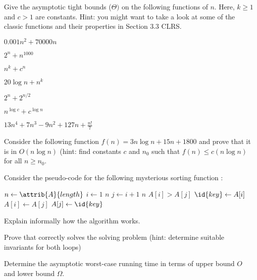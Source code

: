 \documentclass{article}
\begin{document}
\thispagestyle{fancy}

\begin{Exercise}

    \noindent
    Give the asymptotic tight bounds ($\Theta)$ on the following functions of
    $n$. Here, $k \geq 1$ and $c > 1$ are constants. Hint: you might want to
    take a look at some of the classic functions and their properties in Section
    3.3 CLRS.

    \Question
    $0.001n^2 + 70000n$
    
    \Question
    $2^n + n^{1000}$

    \Question
    $n^k + c^n$

    \Question
    $20 \log n + n^k$

    \Question
    $2^n + 2^{n/2}$

    \Question
    $n^{\log c} + c^{\log n}$

    \Question
    $13n^4 + 7n^3 - 9n^2 + 127n + \frac{n!}{7}$
\end{Exercise}

\begin{Exercise}
    
    \noindent
    Consider the following function $f(n) = 3n \log n + 15n + 1800$ and prove
    that it is in $O(n \log n)$ (hint: find constants $c$ and $n_0$ such that
    $f(n) \leq c(n \log n)$ for all $n \geq n_0$.

\end{Exercise}

\begin{Exercise}

    \noindent
    Consider the pseudo-code for the following mysterious  sorting function
    :
    
    \begin{codebox}
        \li $n \gets \attrib{A}{length}$
        \li \For $i \gets 1$ \To $n$ \Do
            \li \For $j \gets i+1$ \To $n$ \Do
                \li \If $A[i] > A[j]$ \Then
                    \li $\id{key} \gets A[i]$
                    \li $A[i] \gets A[j]$
                    \li $A[j] \gets \id{key}$
                \End
            \End
        \End
        \li \Return {}
    \end{codebox}

    \Question
    Explain informally how the algorithm works.

    \Question
    Prove that  correctly solves the solving problem (hint: determine
    suitable invariants for both loops)

    \Question
    Determine the asymptotic worst-case running time in terms of upper bound $O$
    and lower bound $\Omega$.

\end{Exercise}
\end{document}
